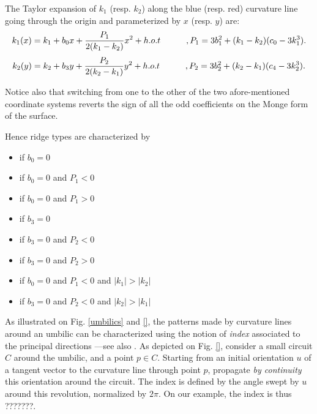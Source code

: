 \noindent The Taylor expansion of $k_1$ (resp. $k_2$) along the blue
(resp. red) curvature line going through the origin and parameterized
by $x$ (resp. $y$) are:
\begin{equation}
\label{eq:taylor_along_line}
k_1(x) = k_1 + b_0x + \frac{P_1}{2(k_1-k_2)}x^2 +h.o.t \quad \quad \quad,
P_1= 3b_1^2+(k_1-k_2)(c_0-3k_1^3).
\end{equation}
%
\begin{equation}
\label{eq:taylor_along_red_line}
k_2(y) = k_2 + b_3y + \frac{P_2}{2(k_2-k_1)}y^2 +h.o.t \quad \quad \quad,
P_2= 3b_2^2+(k_2-k_1)(c_4-3k_2^3).
\end{equation}

\noindent Notice also that switching from one to the other of the two
afore-mentioned coordinate systems reverts the sign of all the odd
coefficients on the Monge form of the surface.
\medskip

Hence ridge types are characterized by 
\begin{itemize}
\item
{} if $b_0=0$
\item
{} if  $b_0=0$ and $P_1<0$
\item
  if  $b_0=0$ and $P_1>0$
\item
  if  $b_3=0$
\item
  if  $b_3=0$ and $P_2<0$
\item
{} if  $b_3=0$ and $P_2>0$
\item
{} if  $b_0=0$  and $P_1<0$ and $|k_1|>|k_2|$
\item
{} if  $b_3=0$ and $P_2<0$ and $|k_2|>|k_1|$
\end{itemize}



As illustrated on Fig. \ref{umbilics} and \ref{}, the patterns made by
curvature lines around an umbilic can be characterized using the
notion of {\em index} associated to the principal directions ---see
also \cite{cgal:cp-dtges-05}.
As depicted on Fig. \ref{}, consider a small circuit $C$ around the
umbilic, and a point $p \in C$. Starting from an initial orientation
$u$ of a tangent vector to the curvature line through point $p$,
propagate {\em by continuity} this orientation around the circuit.  The
index is defined by the angle swept by $u$ around this revolution,
normalized by $2\pi$. On our example, the index is thus ???????.

